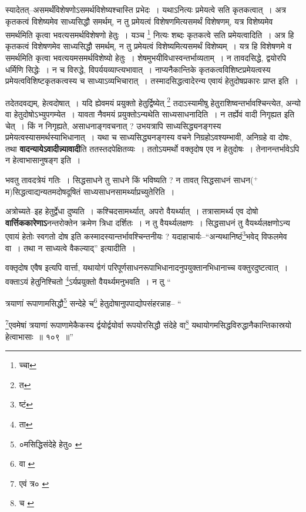 \documentclass[article,12pt,a4paper]{memoir}
\newcommand{\add}[1]{($^{+}$#1)}
\begin{document}
	  \pstart स्यादेतत्--असमर्थंविशेषणोऽसमर्थविशेष्यश्चास्ति प्रभेदः । यथाऽनित्यः प्रमेयत्वे सति कृतकत्वात् । अत्र कृतकत्वं विशेष्यमेव साध्यसिद्धौ समर्थम्, न तु प्रमेयत्वं विशेषणमित्यसमर्थं विशेषणम्, यत्र विशेष्यमेव समर्थमिति कृत्वा भवत्यसमर्थविशेषणो हेतुः । यञ्च \footnote{च्चा} नित्यः शब्दः कृतकत्वे सति प्रमेयत्वादिति । अत्र हि कृतकत्वं विशेषणमेव साध्यसिद्धौ समर्थम्, न तु प्रमेयत्वं विशेष्यमित्यसमर्थं विशेष्यम् । यत्र हि विशेषणमे \leavevmode{} व समर्थमिति कृत्वा भवत्ययमसमर्थविशेष्यो हेतुः । शेषमुभयीविधास्वन्तर्भाव्यताम् । न तावदसिद्धे, द्वयोरपि धर्मिणि सिद्धेः । न च विरुद्धे, विपर्ययव्याप्त्यभावात् । नाप्यनैकान्तिके कृतकत्वविशिष्टप्रमेयत्वस्य प्रमेयत्वविशिष्टकृतकत्वस्य च साध्याऽव्यभिचारात् । तस्मादसिद्धत्वादेरन्य एवायं हेतुदोषप्रकारः प्राप्त इति ।
	\pend
      

	  \pstart तदेतदवद्यम्, हेत्वदोषात् । यदि ह्येवमयं प्रयुक्तो हेतुर्द्विष्येत् \footnote{त} तदाऽस्यामीषु हेतुराशिष्वन्तर्भावश्चिन्त्येत, अन्यो वा हेतुदोषोऽभ्युपगम्येत । यावता नैवमयं प्रयुक्तोऽन्यथेति साध्यसाधनादिति । न तर्ह्येवं वादी निगृह्यत इति चेत् । किं न निगृह्यते, असाधनाङ्गवचनात् ? उभयत्रापि साध्यसिद्ध्यनङ्गस्य प्रमेयत्वस्यासमर्थस्याभिधानात् । यथा च साध्यसिद्ध्यनङ्गस्य वचने निग्रहोऽवश्यम्भावी, अनिग्रहे वा दोषः, तथा \textbf{वादन्यायेऽवादीन्न्यावादी}ति ततस्तदपेक्षितव्यः । ततोऽयमर्थो वक्तृदोष एव न हेतुदोषः । तेनानन्तर्भावेऽपि न हेत्वाभासानुषङ्ग इति ।
	\pend
      

	  \pstart भवतु तावदत्रेयं गतिः । सिद्धसाधने तु साधने किं भविष्यति ? न तावत् सिद्धसाधनं साधन\add{म}सिद्धत्वाद्यन्यतमदोषदूषितं साध्यसाधनसामर्थ्याप्रच्युतेरिति ।
	\pend
      

	  \pstart अत्रोच्यते--इह हेतुर्द्वेधा दुष्यति । कश्चिदसामर्थ्यात्, अपरो वैयर्थ्यात् । तत्रासामर्थ्य एव दोषो \textbf{वार्त्तिककारेणाऽ}नन्तरोक्तेन क्रमेण त्रिधा दर्शितः । न तु वैयर्थ्यलक्षणः । सिद्धसाधनं तु वैयर्थ्यलक्षणोऽन्य एवायं हेतोः स्वगतो दोष इति कस्मादस्यान्तर्भावश्चिन्तनीयः ? यदाहाचार्यः--“अन्यथानिष्ठं\footnote{ष्टं}\-भवेद् विफलमेव वा । तथा न साध्यत्वे वैकल्याद्” इत्यादीति ।
	\pend
      

	  \pstart वक्तृदोष एवैष इत्यपि वार्त्ता, यथायोगं परिपूर्णसाधनरूपाभिधानादनुपयुक्तानभिधानाच्च वक्तुरदुष्टत्वात् । वक्ताऽयं हेतुनिश्चितो \footnote{ता}\-ऽर्यप्रयुक्तो वैयर्थ्यमनुभवति । न तु \leavevmode{} “
	  
	त्रयाणां रूपाणामसिद्धौ\footnote{०मसिद्धिसंदेहे हेतु० \cite{dp-msC}} सन्देहे च\footnote{वा \cite{dp-msD}} हेतुदोषानुपपाद्योपसंहरन्नाह-- “
	  
	\footnote{एवं त्र० \cite{dp-msB} \cite{dp-msD} \cite{dp-edP} \cite{dp-edH} \cite{dp-edE} \cite{dp-edN}}\-एवमेषां त्रयाणां रूपाणामेकैकस्य र्द्वयोर्द्वयोर्वा रूपयोरसिद्धौ संदेहे वा\footnote{च \cite{dp-msB} \cite{dp-edP} \cite{dp-edH} \cite{dp-edE} \cite{dp-edN}} यथायोगमसिद्धविरुद्धानैकान्तिकास्रयो हेत्वाभासाः ॥ १०९ ॥” 
	  
\end{document}
